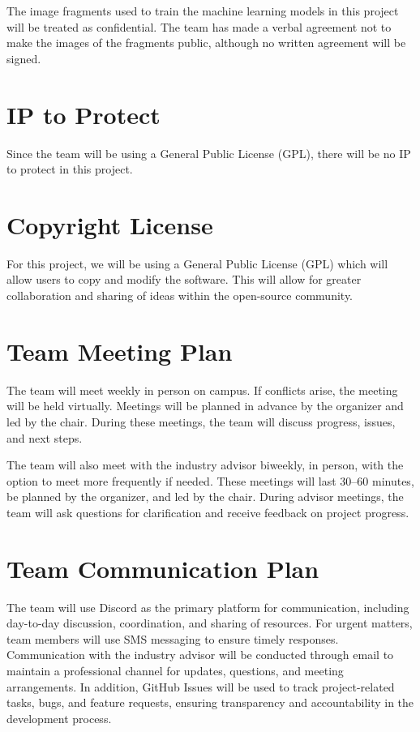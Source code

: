 \documentclass{article}
\begin{document}
The image fragments used to train the machine learning models in this project will be treated as confidential. The team has made a verbal agreement not to make the images of the fragments public, although no written agreement will be signed.

\section{IP to Protect}


Since the team will be using a General Public License (GPL), there will be no IP to protect in this project.
\section{Copyright License}

For this project, we will be using a General Public License (GPL) which will allow users to copy and modify the software. This will allow for greater collaboration and sharing of ideas within the open-source community.

\section{Team Meeting Plan}

The team will meet weekly in person on campus. If conflicts arise, the meeting will be held virtually. Meetings will be planned in advance by the organizer and led by the chair. During these meetings, the team will discuss progress, issues, and next steps.

The team will also meet with the industry advisor biweekly, in person, with the option to meet more frequently if needed. These meetings will last 30–60 minutes, be planned by the organizer, and led by the chair. During advisor meetings, the team will ask questions for clarification and receive feedback on project progress.

\section{Team Communication Plan}

The team will use Discord as the primary platform for communication, including day-to-day
discussion, coordination, and sharing of resources. For urgent matters, team members will
use SMS messaging to ensure timely responses. Communication with the industry advisor will
be conducted through email to maintain a professional channel for updates, questions, and
meeting arrangements. In addition, GitHub Issues will be used to track project-related tasks,
bugs, and feature requests, ensuring transparency and accountability in the development process.
\end{document}
